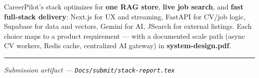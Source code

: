 \documentclass[11pt,a4paper]{article}
\begin{document}
\noindent
CareerPilot's stack optimizes for \textbf{one RAG store}, \textbf{live job search}, and \textbf{fast full-stack delivery}: Next.js for UX and streaming, FastAPI for CV/job logic, Supabase for data and vectors, Gemini for AI, JSearch for external listings. Each choice maps to a product requirement --- with a documented scale path (async CV workers, Redis cache, centralized AI gateway) in \textbf{system-design.pdf}.

\vspace{1.2em}
\hrule
\vspace{0.4em}
{\footnotesize\itshape Submission artifact --- \texttt{Docs/submit/stack-report.tex}}
\end{document}
